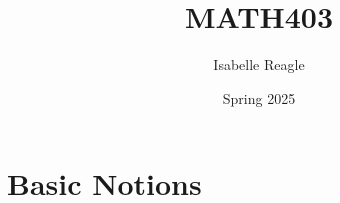 \documentclass[10pt, oneside]{article}
\title{MATH403}
\author{Isabelle Reagle}
\date{Spring 2025}
\begin{document}
\maketitle
\tableofcontents

\vspace{.25in}

\section{Basic Notions}


\end{document}
